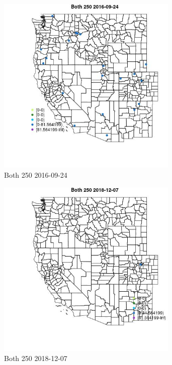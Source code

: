 \begin{figure} 
\centering  
\includegraphics[width=0.77\textwidth]{Code_Outputs/Report_ML_input_PM25_Step4_part_e_de_duplicated_aves_MapObsBoth_2502016-09-24.jpg} 
\caption{\label{fig:Report_ML_input_PM25_Step4_part_e_de_duplicated_avesMapObsBoth_2502016-09-24}Both 250 2016-09-24} 
\end{figure} 
 

\clearpage 

\begin{figure} 
\centering  
\includegraphics[width=0.77\textwidth]{Code_Outputs/Report_ML_input_PM25_Step4_part_e_de_duplicated_aves_MapObsBoth_2502018-12-07.jpg} 
\caption{\label{fig:Report_ML_input_PM25_Step4_part_e_de_duplicated_avesMapObsBoth_2502018-12-07}Both 250 2018-12-07} 
\end{figure} 
 

